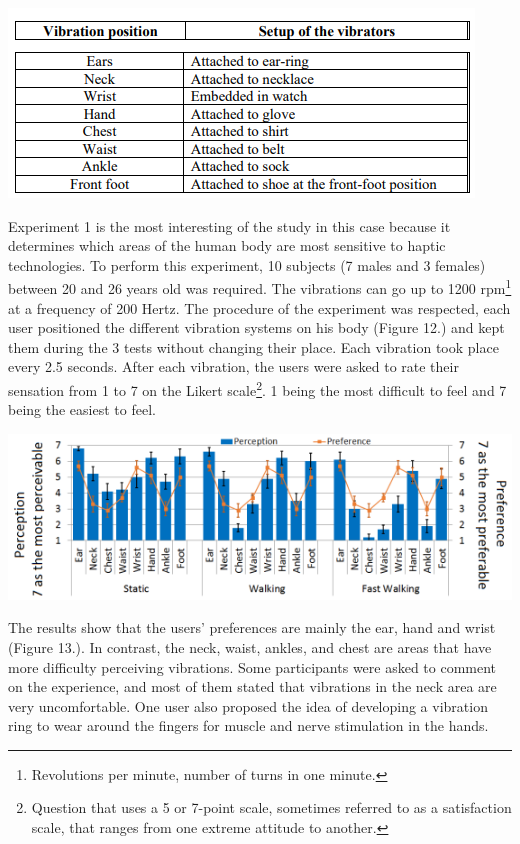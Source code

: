 \documentclass[12pt, a4paper]{article}
\begin{document}
\begin{multicols}{2}
\vspace*{3mm}
\captionsetup{type=figure}
\includegraphics[width=.49\textwidth]{vibrators.png}
\vspace*{3mm}

Experiment 1 is the most interesting of the study in this case because it determines which areas of the human body are most sensitive to haptic technologies. To perform this experiment, 10 subjects (7 males and 3 females) between 20 and 26 years old was required. The vibrations can go up to 1200 rpm\footnote{Revolutions per minute, number of turns in one minute.} at a frequency of 200 Hertz. The procedure of the experiment was respected, each user positioned the different vibration systems on his body (Figure 12.) and kept them during the 3 tests without changing their place. Each vibration took place every 2.5 seconds. After each vibration, the users were asked to rate their sensation from 1 to 7 on the Likert scale\footnote{Question that uses a 5 or 7-point scale, sometimes referred to as a satisfaction scale, that ranges from one extreme attitude to another.}. 1 being the most difficult to feel and 7 being the easiest to feel\cite{humancomputer}.

\vspace*{3mm}
\captionsetup{type=figure}
\includegraphics[width=.49\textwidth]{Perceivability.png}
\vspace*{3mm}

The results show that the users' preferences are mainly the ear, hand and wrist (Figure 13.). In contrast, the neck, waist, ankles, and chest are areas that have more difficulty perceiving vibrations. Some participants were asked to comment on the experience, and most of them stated that vibrations in the neck area are very uncomfortable. One user also proposed the idea of developing a vibration ring to wear around the fingers for muscle and nerve stimulation in the hands\cite{humancomputer}.


\end{multicols}
\end{document}
